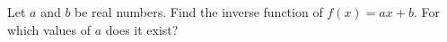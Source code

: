 Let $a$ and $b$ be real numbers. Find the inverse function of $f(x)=ax+b$. For which values of $a$ does it exist?

